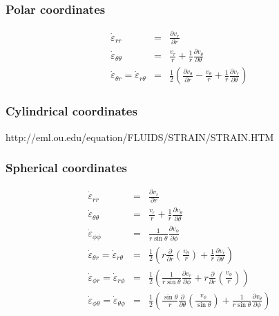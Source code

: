 \subsubsection{Polar coordinates}

\begin{eqnarray}
\dot\varepsilon_{rr} &=& \frac{\partial v_r}{\partial r} \\
\dot\varepsilon_{\theta\theta} &=& \frac{v_r}{r} + \frac{1}{r} \frac{\partial v_\theta}{\partial \theta}  \\
\dot\varepsilon_{\theta r} =
\dot\varepsilon_{r\theta} &=& \frac{1}{2} \left(   \frac{\partial v_\theta}{\partial r} - \frac{v_\theta}{r} 
+\frac{1}{r} \frac{\partial v_r}{\partial \theta}  \right) 
\end{eqnarray}

\subsubsection{Cylindrical coordinates}

http://eml.ou.edu/equation/FLUIDS/STRAIN/STRAIN.HTM

\subsubsection{Spherical coordinates}

\begin{eqnarray}
\dot\varepsilon_{rr} &=& \frac{\partial v_r}{\partial r} \\
\dot\varepsilon_{\theta\theta} &=& \frac{v_r}{r} + \frac{1}{r} \frac{\partial v_\theta}{\partial \theta}  \\
\dot\varepsilon_{\phi\phi} &=& \frac{1}{r \sin\theta} \frac{\partial v_\phi}{\partial \phi} \\
\dot\varepsilon_{\theta r} =
\dot\varepsilon_{r\theta}   &=& \frac{1}{2} \left( r \frac{\partial}{\partial r} (\frac{v_\theta}{r} ) 
+\frac{1}{r} \frac{\partial v_r}{\partial \theta} \right) \\
\dot\varepsilon_{\phi r} =
\dot\varepsilon_{r\phi}      &=&  \frac{1}{2} \left(  \frac{1}{r \sin\theta} \frac{\partial v_r}{\partial \phi} 
+ r \frac{\partial }{\partial r} (\frac{v_\phi}{r}) \right)  \\
\dot\varepsilon_{\phi \theta} =
\dot\varepsilon_{\theta\phi} &=& \frac{1}{2} \left( \frac{\sin \theta}{r} \frac{\partial }{\partial \theta} (\frac{v_\phi}{\sin\theta}) + \frac{1}{r \sin\theta} \frac{\partial v_\theta}{\partial \phi}    \right) 
\end{eqnarray}



